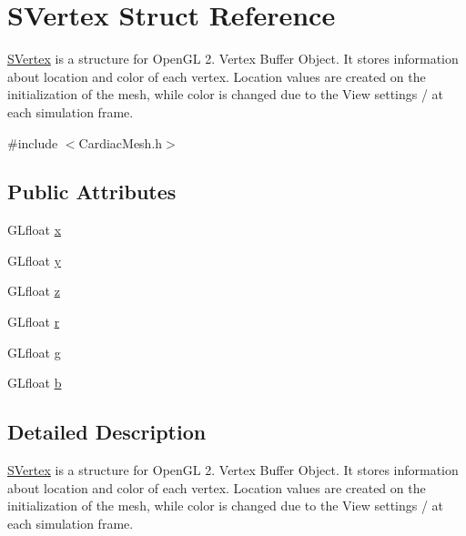 \hypertarget{struct_s_vertex}{\section{S\+Vertex Struct Reference}
\label{struct_s_vertex}
}


\hyperlink{struct_s_vertex}{S\+Vertex} is a structure for Open\+G\+L 2. Vertex Buffer Object. It stores information about location and color of each vertex. Location values are created on the initialization of the mesh, while color is changed due to the View settings / at each simulation frame.  




{\ttfamily \#include $<$Cardiac\+Mesh.\+h$>$}

\subsection*{Public Attributes}
\begin{DoxyCompactItemize}
\item 
G\+Lfloat \hyperlink{struct_s_vertex_a5f1f1d9f65da1828f1f5228f036a1e7b}{x}
\item 
G\+Lfloat \hyperlink{struct_s_vertex_a032f82bfe624055abca2c89f7f073080}{y}
\item 
G\+Lfloat \hyperlink{struct_s_vertex_a52b7560faaa70a1e61b8221135e50d63}{z}
\item 
G\+Lfloat \hyperlink{struct_s_vertex_a569fbf3b7596904acf89120c18508ba7}{r}
\item 
G\+Lfloat \hyperlink{struct_s_vertex_a45e2a28d0e25827f9267a77a6ae47fcb}{g}
\item 
G\+Lfloat \hyperlink{struct_s_vertex_a27979f0b7a77327a31d2525007300e91}{b}
\end{DoxyCompactItemize}


\subsection{Detailed Description}
\hyperlink{struct_s_vertex}{S\+Vertex} is a structure for Open\+G\+L 2. Vertex Buffer Object. It stores information about location and color of each vertex. Location values are created on the initialization of the mesh, while color is changed due to the View settings / at each simulation frame. 

